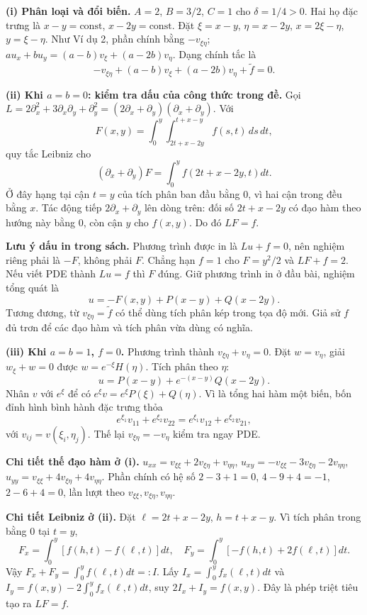 \textbf{(i) Phân loại và đổi biến.} $A=2$, $B=3/2$, $C=1$ cho $\delta=1/4>0$. Hai họ đặc trưng là $x-y=\mathrm{const}$, $x-2y=\mathrm{const}$. Đặt $\xi=x-y$, $\eta=x-2y$, $x=2\xi-\eta$, $y=\xi-\eta$. Như Ví dụ 2, phần chính bằng $-v_{\xi\eta}$; $au_x+bu_y=(a-b)v_\xi+(a-2b)v_\eta$. Dạng chính tắc là
\[-v_{\xi\eta}+(a-b)v_\xi+(a-2b)v_\eta+\widetilde f=0.\]

\textbf{(ii) Khi $a=b=0$: kiểm tra dấu của công thức trong đề.} Gọi $L=2\partial_x^2+3\partial_x\partial_y+\partial_y^2=(2\partial_x+\partial_y)(\partial_x+\partial_y)$. Với
\[F(x,y)=\int_0^y\int_{2t+x-2y}^{t+x-y}f(s,t)\,ds\,dt,\]
quy tắc Leibniz cho
\[(\partial_x+\partial_y)F=\int_0^y f(2t+x-2y,t)dt.\]
Ở đây hạng tại cận $t=y$ của tích phân ban đầu bằng $0$, vì hai cận trong đều bằng $x$. Tác động tiếp $2\partial_x+\partial_y$ lên dòng trên: đối số $2t+x-2y$ có đạo hàm theo hướng này bằng $0$, còn cận $y$ cho $f(x,y)$. Do đó $LF=f$.

\textbf{Lưu ý dấu in trong sách.} Phương trình được in là $Lu+f=0$, nên nghiệm riêng phải là $-F$, không phải $F$. Chẳng hạn $f=1$ cho $F=y^2/2$ và $LF+f=2$. Nếu viết PDE thành $Lu=f$ thì $F$ đúng. Giữ phương trình in ở đầu bài, nghiệm tổng quát là
\[\boxed{u=-F(x,y)+P(x-y)+Q(x-2y).}\]
Tương đương, từ $v_{\xi\eta}=\widetilde f$ có thể dùng tích phân kép trong tọa độ mới. Giả sử $f$ đủ trơn để các đạo hàm và tích phân vừa dùng có nghĩa.

\textbf{(iii) Khi $a=b=1$, $f=0$.} Phương trình thành $v_{\xi\eta}+v_\eta=0$. Đặt $w=v_\eta$, giải $w_\xi+w=0$ được $w=e^{-\xi}H(\eta)$. Tích phân theo $\eta$:
\[\boxed{u=P(x-y)+e^{-(x-y)}Q(x-2y).}\]
Nhân $v$ với $e^\xi$ để có $e^\xi v=e^\xi P(\xi)+Q(\eta)$. Vì là tổng hai hàm một biến, bốn đỉnh hình bình hành đặc trưng thỏa
\[e^{\xi_1}v_{11}+e^{\xi_2}v_{22}=e^{\xi_1}v_{12}+e^{\xi_2}v_{21},\]
với $v_{ij}=v(\xi_i,\eta_j)$. Thế lại $v_{\xi\eta}=-v_\eta$ kiểm tra ngay PDE.

\textbf{Chi tiết thế đạo hàm ở (i).} $u_{xx}=v_{\xi\xi}+2v_{\xi\eta}+v_{\eta\eta}$, $u_{xy}=-v_{\xi\xi}-3v_{\xi\eta}-2v_{\eta\eta}$, $u_{yy}=v_{\xi\xi}+4v_{\xi\eta}+4v_{\eta\eta}$. Phần chính có hệ số $2-3+1=0$, $4-9+4=-1$, $2-6+4=0$, lần lượt theo $v_{\xi\xi},v_{\xi\eta},v_{\eta\eta}$.

\textbf{Chi tiết Leibniz ở (ii).} Đặt $\ell=2t+x-2y$, $h=t+x-y$. Vì tích phân trong bằng $0$ tại $t=y$,
\[F_x=\int_0^y[f(h,t)-f(\ell,t)]dt,\quad
F_y=\int_0^y[-f(h,t)+2f(\ell,t)]dt.\]
Vậy $F_x+F_y=\int_0^yf(\ell,t)dt=:I$. Lấy $I_x=\int_0^yf_x(\ell,t)dt$ và $I_y=f(x,y)-2\int_0^yf_x(\ell,t)dt$, suy $2I_x+I_y=f(x,y)$. Đây là phép triệt tiêu tạo ra $LF=f$.

